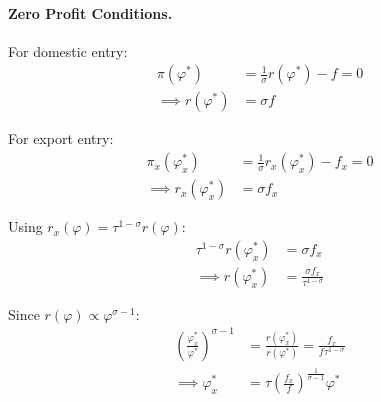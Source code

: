 \begin{solution}
		\paragraph{Zero Profit Conditions.} For domestic entry:
		\begin{align*}
			\pi(\varphi^*) &= \frac{1}{\sigma} r(\varphi^*) - f = 0 \\
			\implies r(\varphi^*) &= \sigma f
		\end{align*}

		For export entry:
		\begin{align*}
			\pi_x(\varphi_x^*) &= \frac{1}{\sigma} r_x(\varphi_x^*) - f_x = 0 \\
			\implies r_x(\varphi_x^*) &= \sigma f_x
		\end{align*}

		Using $r_x(\varphi) = \tau^{1-\sigma} r(\varphi)$:
		\begin{align*}
			\tau^{1-\sigma} r(\varphi_x^*) &= \sigma f_x \\
			\implies r(\varphi_x^*) &= \frac{\sigma f_x}{\tau^{1-\sigma}}
		\end{align*}

		Since $r(\varphi) \propto \varphi^{\sigma-1}$:
		\begin{align*}
			\left( \frac{\varphi_x^*}{\varphi^*} \right)^{\sigma-1} &= \frac{r(\varphi_x^*)}{r(\varphi^*)} = \frac{f_x}{f \tau^{1-\sigma}} \\
			\implies \varphi_x^* &= \tau \left( \frac{f_x}{f} \right)^{\frac{1}{\sigma-1}} \varphi^*
		\end{align*}
	\end{solution}